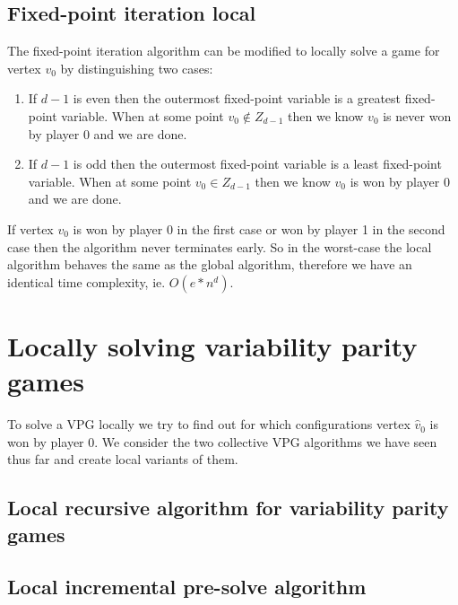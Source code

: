 \subsection{Fixed-point iteration local}
The fixed-point iteration algorithm can be modified to locally solve a game for vertex $v_0$ by distinguishing two cases:
\begin{enumerate}
	\item If $d-1$ is even then the outermost fixed-point variable is a greatest fixed-point variable. When at some point $v_0 \notin Z_{d-1}$ then we know $v_0$ is never won by player $0$ and we are done.
	\item If $d-1$ is odd then the outermost fixed-point variable is a least fixed-point variable. When at some point $v_0 \in Z_{d-1}$ then we know $v_0$ is won by player $0$ and we are done.
\end{enumerate}

If vertex $v_0$ is won by player 0 in the first case or won by player 1 in the second case then the algorithm never terminates early. So in the worst-case the local algorithm behaves the same as the global algorithm, therefore we have an identical time complexity, ie. $O(e*n^d)$.

\section{Locally solving variability parity games}
To solve a VPG locally we try to find out for which configurations vertex $\hat{v}_0$ is won by player $0$. We consider the two collective VPG algorithms we have seen thus far and create local variants of them.
\subsection{Local recursive algorithm for variability parity games}


\subsection{Local incremental pre-solve algorithm}
